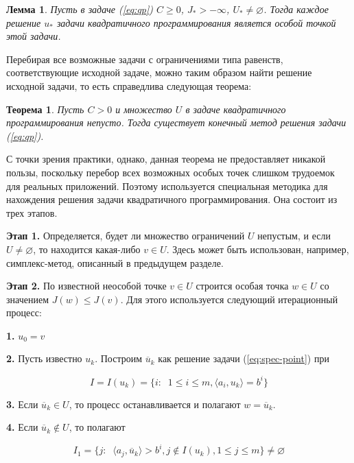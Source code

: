 \documentclass[a4paper, 12pt, titlepage]{article}
\theoremstyle{definition}
\theoremstyle{plain}
\newtheorem{SmartTheorem}{Теорема}
\theoremstyle{plain}
\newtheorem{SmartLemma}{Лемма}
\begin{document}
\begin{SmartLemma}
 Пусть в задаче (\ref{eq:qp}) $C \geq 0$, $J_{*} > - \infty$,
 $U_{*} \neq \varnothing$. Тогда каждое решение $u_{*}$ задачи квадратичного 
 программирования является особой  точкой этой задачи.
\end{SmartLemma}

Перебирая все возможные задачи с ограничениями типа равенств, соответствующие
исходной задаче, можно таким образом найти решение исходной задачи, то есть
справедлива следующая теорема:

\begin{SmartTheorem}
 Пусть $C > 0$ и множество $U$ в задаче квадратичного программирования непусто.
 Тогда существует конечный метод решения задачи (\ref{eq:qp}).
\end{SmartTheorem}

С точки зрения практики, однако, данная теорема не предоставляет никакой пользы,
поскольку перебор всех возможных особых точек слишком трудоемок для реальных
приложений. Поэтому используется специальная методика для нахождения решения
задачи квадратичного программирования. Она состоит из трех этапов.

\textbf{Этап 1.} Определяется, будет ли множество ограничений $U$ непустым, и 
если $U \neq \varnothing$, то находится какая-либо $v \in U$. Здесь может быть
использован, например, симплекс-метод, описанный в предыдущем разделе.

\textbf{Этап 2.} По известной неособой точке $v \in U$ строится особая точка
$w \in U$ со значением $J(w) \leq J(v)$. Для этого используется следующий
итерационный процесс:

\textbf{1.} $u_{0} = v$

\textbf{2.} Пусть известно $u_{k}$. Построим $\overline{u}_{k}$ как решение
задачи (\ref{eq:spec-point}) при

\begin{equation}
 I = I(u_{k}) = \{i: \;\;
 1 \leq i \leq m, \langle a_{i}, u_{k} \rangle = b^{i}\}
\end{equation}

\textbf{3.} Если $\overline{u}_{k} \in U$, то процесс останавливается и полагают
$w = \overline{u}_{k}$.

\textbf{4.} Если $\overline{u}_{k} \notin U$, то полагают

\begin{equation}
 I_{1} = \{j: \;\; \langle a_{j}, \overline{u}_{k} \rangle > b^{i},
 j \notin I(u_{k}), 1 \leq j \leq m\} \neq \varnothing
\end{equation}
\end{document}
